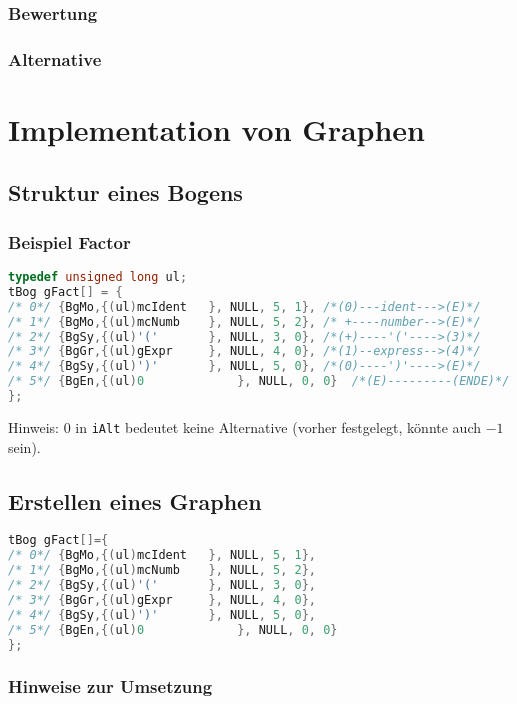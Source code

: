 \subsubsection{Bewertung}
\subsubsection*{Alternative}

\section{Implementation von Graphen}
\subsection{Struktur eines Bogens}
\subsubsection*{Beispiel Factor}
\begin{lstlisting}[language=C]
typedef unsigned long ul;
tBog gFact[] = {
/* 0*/ {BgMo,{(ul)mcIdent	}, NULL, 5, 1},	/*(0)---ident--->(E)*/
/* 1*/ {BgMo,{(ul)mcNumb 	}, NULL, 5, 2},	/* +----number-->(E)*/
/* 2*/ {BgSy,{(ul)'(' 		}, NULL, 3, 0},	/*(+)----'('---->(3)*/
/* 3*/ {BgGr,{(ul)gExpr 	}, NULL, 4, 0},	/*(1)--express-->(4)*/
/* 4*/ {BgSy,{(ul)')' 		}, NULL, 5, 0},	/*(0)----')'---->(E)*/
/* 5*/ {BgEn,{(ul)0 			}, NULL, 0, 0} 	/*(E)---------(ENDE)*/
};
\end{lstlisting}
Hinweis: $0$ in \lstinline`iAlt` bedeutet keine Alternative (vorher festgelegt, könnte auch $-1$ sein).
\subsection{Erstellen eines Graphen}
\begin{lstlisting}[language=C]
tBog gFact[]={
/* 0*/ {BgMo,{(ul)mcIdent	}, NULL, 5, 1},
/* 1*/ {BgMo,{(ul)mcNumb	}, NULL, 5, 2},
/* 2*/ {BgSy,{(ul)'(' 		}, NULL, 3, 0},
/* 3*/ {BgGr,{(ul)gExpr 	}, NULL, 4, 0},
/* 4*/ {BgSy,{(ul)')' 		}, NULL, 5, 0},
/* 5*/ {BgEn,{(ul)0 			}, NULL, 0, 0}
};
\end{lstlisting}
\subsubsection*{Hinweise zur Umsetzung}
